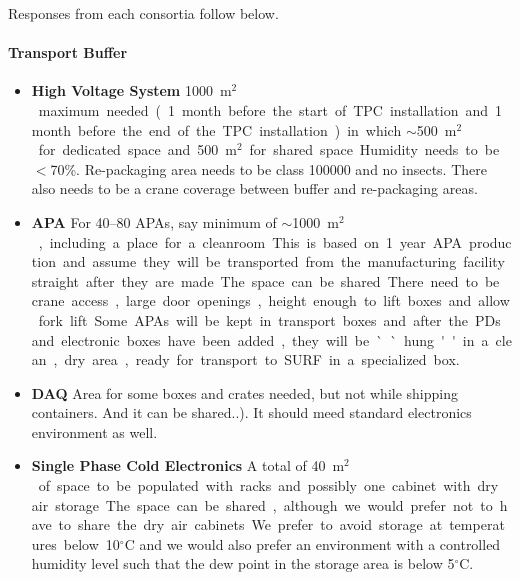 \noindent Responses from each consortia follow below.

\paragraph{\bf Transport Buffer}
\begin{itemize}
 \item {\bf High Voltage System} \SI{1000}{m$^2$} maximum needed
   (\num{1} month before the start of TPC installation and \num{1}
   month before the end of the TPC installation) in which
   $\sim$\SI{500}{m$^2$} for dedicated space and \SI{500}{m$^2$} for
   shared space.  Humidity needs to be $<$70\%. Re-packaging area
   needs to be class \num{100000} and no insects. There also needs to be a
   crane coverage between buffer and re-packaging areas.
  \item {\bf APA} For 40--80 APAs, say minimum of
    $\sim$\SI{1000}{m$^2$}, including a place for a cleanroom.  This
    is based on \num{1} year APA production and assume they will be
    transported from the manufacturing facility straight after they
    are made.  The space can be shared.  There need to be crane
    access, large door openings, height enough to lift boxes and allow
    fork lift.  Some APAs will be kept in transport boxes and after
    the PDs and electronic boxes have been added, they will be
    ``hung'' in a clean, dry area, ready for transport to SURF in a
    specialized box.
  \item {\bf DAQ} Area for some boxes and crates needed, but not while
    shipping containers.  And it can be shared..). It should meed
    standard electronics environment as well.
  \item {\bf Single Phase Cold Electronics} A total of \SI{40}{m$^2$}
    of space to be populated with racks and possibly one cabinet with
    dry air storage.  The space can be shared, although we would
    prefer not to have to share the dry air cabinets.  We prefer to
    avoid storage at temperatures below 10$^\circ$C and we would also
    prefer an environment with a controlled humidity level such that
    the dew point in the storage area is below 5$^\circ$C.


\end{itemize}
